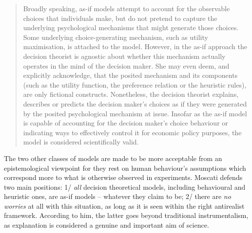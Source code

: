 \documentclass[a4paper,11pt]{article}
\theoremstyle{definition}
\begin{document}
\begin{quote}
    Broadly speaking, as-if models attempt to account for the observable choices that individuals make, but do not pretend to capture the underlying psychological mechanisms that might generate those choices. Some underlying choice-generating mechanism, such as utility maximisation, is attached to the model. However, in the as-if approach the decision theorist is agnostic about whether this mechanism actually operates in the mind of the decision maker. She may even deem, and explicitly acknowledge, that the posited mechanism and its components (such as the utility function, the preference relation or the heuristic rules), are only fictional constructs. Nonetheless, the decision theorist explains, describes or predicts the decision maker’s choices as if they were generated by the posited psychological mechanism at issue. Insofar as the as-if model is capable of accounting for the decision maker’s choice behaviour or indicating ways to effectively control it for economic policy purposes, the model is considered scientifically valid.
\end{quote}

The two other classes of models are made to be more acceptable from an epistemological viewpoint for they rest on human behaviour's assumptions which correspond more to what is otherwise observed in experiments. Moscati defends two main positions: 1/ \textit{all} decision theoretical models, including behavioural and heuristic ones, are as-if models -- whatever they claim to be; 2/ there are \textit{no worries} at all with this situation, as long as it is seen within the right antirealist framework. According to him, the latter goes beyond traditional instrumentalism, as explanation is considered a genuine and important aim of science. 
\end{document}
